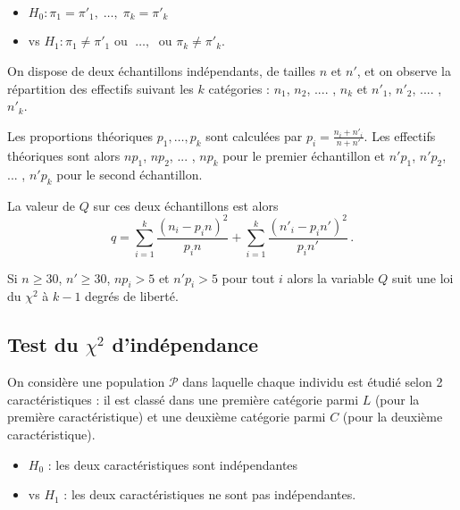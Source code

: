 \documentclass[12pt, a4paper]{article}
\begin{document}
\begin{itemize}
\item[] $H_0 : \pi_1=\pi'_1, \;\hdots,\; \pi_k=\pi'_k$
\item[] vs  $H_1 : \pi_1 \neq \pi'_1  \mbox{ ou } \;\hdots,\; \mbox{ ou } \pi_k \neq \pi'_k$. \\
\end{itemize}

On dispose de deux échantillons indépendants, de tailles $n$ et $n'$, et
on observe la répartition des effectifs suivant les $k$ catégories : $n_1$, $n_2$, .... , $n_k$ et  $n'_1$, $n'_2$, .... , $n'_k$.

Les proportions théoriques $p_1, \hdots, p_k$ sont calculées par 
$\displaystyle p_i = \frac{n_i+n'_i}{n+n'}$.
Les effectifs théoriques sont alors $np_1$, $np_2$, ... , $np_k$ pour le premier échantillon et $n'p_1$, $n'p_2$, ... , $n'p_k$ pour le second échantillon.

La valeur de $Q$ sur ces deux échantillons est alors
$$
q=\sum_{i=1}^k \frac{(n_i- p_i n)^2}{p_i n}  + \sum_{i=1}^k \frac{(n'_i- p_i n')^2}{p_i n'}\,.
$$

Si $n\geq 30$, $n' \geq 30$, $np_i > 5$ et $n'p_i > 5$ pour tout $i$ 	alors la variable $Q$ suit une 
loi du $\chi^2$ à $k-1$ degrés de liberté.

\subsection[Test du chi-2 d'indépendance]{Test du $\chi^2$ d'indépendance}

On considère une population $\mathcal{P}$ dans laquelle chaque individu est étudié selon 2 caractéristiques : il est classé dans une première catégorie parmi $L$ (pour la première caractéristique) et une deuxième catégorie parmi $C$ (pour la deuxième caractéristique). \\
  
\begin{itemize} 
\item[] $H_0$ : les deux caractéristiques sont indépendantes 
\item[] vs $H_1$ : les deux caractéristiques ne sont pas indépendantes. \\
\end{itemize}
\end{document}
